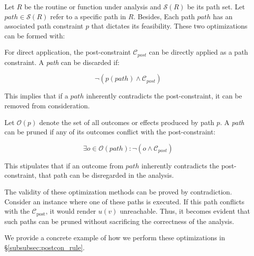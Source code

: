 Let \( R \) be the routine or function under analysis and \( \mathcal{S}(R) \) be its path set. Let \( path \in \mathcal{S}(R) \) refer to a specific path in \( R \). Besides, Each path \(path\) has an associated path constraint \(p\) that dictates its feasibility. These two optimizations can be formed with:


 For direct application, the post-constraint \(\mathcal{C}_{post}\) can be directly applied as a path constraint. 
A \textit{path} can be discarded if:

\begin{equation*}
\neg ( p(path) \land \mathcal{C}_{post}) 
\end{equation*}

This implies that if a \( path \) inherently contradicts the post-constraint, it can be removed from consideration.

 Let \( \mathcal{O}(p) \) denote the set of all outcomes or effects produced by path \( p \). A \textit{path} can be pruned if any of its outcomes conflict with the post-constraint:

\[
 \exists o \in \mathcal{O}(path) : \neg (o \land \mathcal{C}_{post})
\]

 This stipulates that if an outcome from \( path \) inherently contradicts the post-constraint, that path can be disregarded in the analysis.


 The validity of these optimization methods can be proved by contradiction. Consider an instance where one of these paths is executed. If this path conflicts with the $\mathcal{C}_{\text{post}}$, it would render $u(v)$ unreachable. Thus, it becomes evident that such paths can be pruned without sacrificing the correctness of the analysis.

We provide a concrete example of how we perform these optimizations in \S\ref{subsubsec:postcon_rule}.






